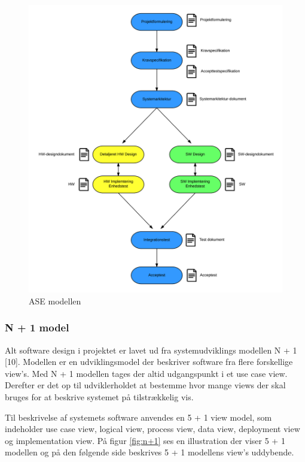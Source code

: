 \begin{figure}[H]
	\centering
	\includegraphics[width=1\textwidth]{Billeder/Udviklingsproces/ase_model}
	\caption{ASE modellen}
	\label{fig:dokument_udvikling}
\end{figure}

\newpage

\subsubsection*{N + 1 model}
Alt software design i projektet er lavet ud fra systemudviklings modellen N + 1 [10]. Modellen er en udviklingsmodel der beskriver software fra flere forskellige view's.  
Med N + 1 modellen tages der altid udgangspunkt i et use case view. Derefter er det op til udviklerholdet at bestemme hvor mange views der skal bruges for at beskrive systemet på tilstrækkelig vis. 

Til beskrivelse af systemets software anvendes en 5 + 1 view model, som indeholder use case view, logical view, process view, data view, deployment view og implementation view. 
På figur \ref{fig:n+1} ses en illustration der viser 5 + 1 modellen og på den følgende side beskrives 5 + 1 modellens view's uddybende. 

